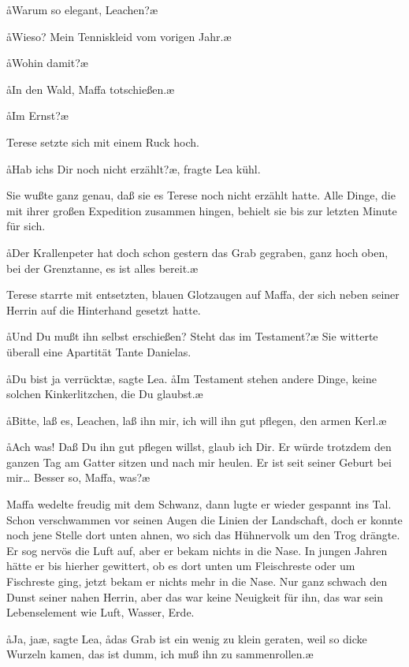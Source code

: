 \aa Warum so elegant, Leachen?\ae

\aa Wieso? Mein Tenniskleid vom vorigen Jahr.\ae

\aa Wohin damit?\ae

\aa In den Wald, Maffa totschießen.\ae

\aa Im Ernst?\ae

Terese setzte sich mit einem Ruck hoch.

\aa Hab ichs Dir noch nicht erzählt?\ae, fragte Lea kühl.

Sie wußte ganz genau, daß sie es Terese noch nicht erzählt
hatte. Alle Dinge, die mit ihrer großen Expedition zusammen\-%
hingen, behielt sie bis zur letzten Minute für sich.

\aa Der Krallenpeter hat doch schon gestern das Grab gegraben,
ganz hoch oben, bei der Grenztanne, es ist alles bereit.\ae

Terese starrte mit entsetzten, blauen Glotzaugen auf Maffa,
der sich neben seiner Herrin auf die Hinterhand gesetzt hatte.

\aa Und Du mußt ihn selbst erschießen? Steht das im Testament?\ae{}
Sie witterte überall eine Apartität Tante Danielas.

\aa Du bist ja verrückt\ae, sagte Lea. \aa Im Testament stehen andere Dinge,
keine solchen Kinkerlitzchen, die Du glaubst.\ae

\aa Bitte, laß es, Leachen, laß ihn mir, ich will ihn gut pflegen,
den armen Kerl.\ae

\aa Ach was! Daß Du ihn gut pflegen willst, glaub ich Dir. Er
würde trotzdem den ganzen Tag am Gatter sitzen und nach
mir heulen. Er ist seit seiner Geburt bei mir\ldots{} Besser so,
Maffa, was?\ae

Maffa wedelte freudig mit dem Schwanz, dann lugte er
wieder gespannt ins Tal. Schon verschwammen vor seinen
Augen die Linien der Landschaft, doch er konnte noch jene
Stelle dort unten ahnen, wo sich das Hühnervolk um den Trog
drängte. Er sog nervös die Luft auf, aber er bekam nichts
in die Nase. In jungen Jahren hätte er bis hierher gewittert,
ob es dort unten um Fleischreste oder um Fischreste ging, jetzt
bekam er nichts mehr in die Nase. Nur ganz schwach den Dunst
seiner nahen Herrin, aber das war keine Neuigkeit für ihn,
das war sein Lebenselement wie Luft, Wasser, Erde.

\aa Ja, ja\ae, sagte Lea, \aa das Grab ist ein wenig zu klein geraten,
weil so dicke Wurzeln kamen, das ist dumm, ich muß ihn zu\-%
sammenrollen.\ae\eingriff{zusammenrollen.\ae{} ] zusammenrollen\ae.}

